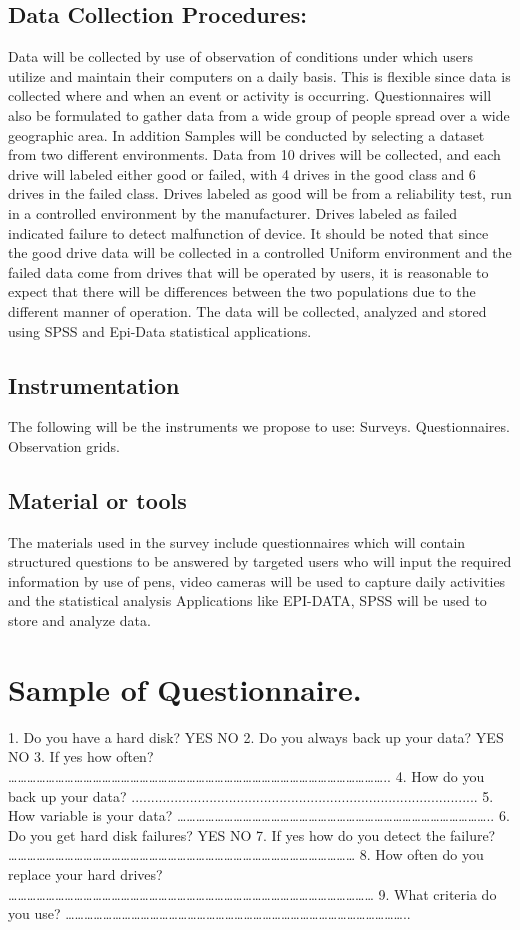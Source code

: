\documentclass{article}
\begin{document}
\subsection{Data Collection Procedures:} 
Data will be collected by use of observation of conditions under which users utilize and maintain their computers on a daily basis. This is flexible since data is collected where and when an event or activity is occurring. 
Questionnaires will also be formulated to gather data from a wide group of people spread over a wide geographic area. 
In addition Samples will be conducted by selecting a dataset from two different environments. 
Data from 10 drives will be collected, and each drive will labeled either good or failed, with 4 drives in the good class and 6 drives in the failed class. Drives labeled as good will be from a reliability test, run in a controlled environment by the manufacturer. Drives labeled as failed indicated failure to detect malfunction of device. It should be noted that since the good drive data will be collected in a controlled 
Uniform environment and the failed data come from drives that will be operated by users, it is reasonable 
to expect that there will be differences between the two populations due to the different manner of operation. 
The data will be collected, analyzed and stored using SPSS and Epi-Data statistical applications. 
\subsection{Instrumentation} 
The following will be the instruments we propose to use: 
Surveys. 
Questionnaires. 
Observation grids. 

\subsection{Material or tools} 
The materials used in the survey include questionnaires which will contain structured questions to be answered by targeted users who will input the required information by use of pens, video cameras will be used to capture daily activities and the statistical analysis Applications like EPI-DATA, SPSS will be used to store and analyze data. 


\section{Sample of Questionnaire.}
1.	Do you have a hard disk?
  YES                                    NO
2.	Do you always back up your data?
                   YES                                 NO
3.	If yes how often?
…………………………………………………………………………………………………………..
4.	How do you back up your data?
.........................................................................................
5.	How variable is your data?
………………………………………………………………………………………..
6.	Do you get hard disk failures?
                   YES                                 NO
7.	If yes how do you detect the failure?
…………………………………………………………………………………………………
8.	How often do you replace your hard drives?
     ………………………………………………………………………………………………………
9.	What criteria do you use?
………………………………………………………………………………………………..
\end{document}
